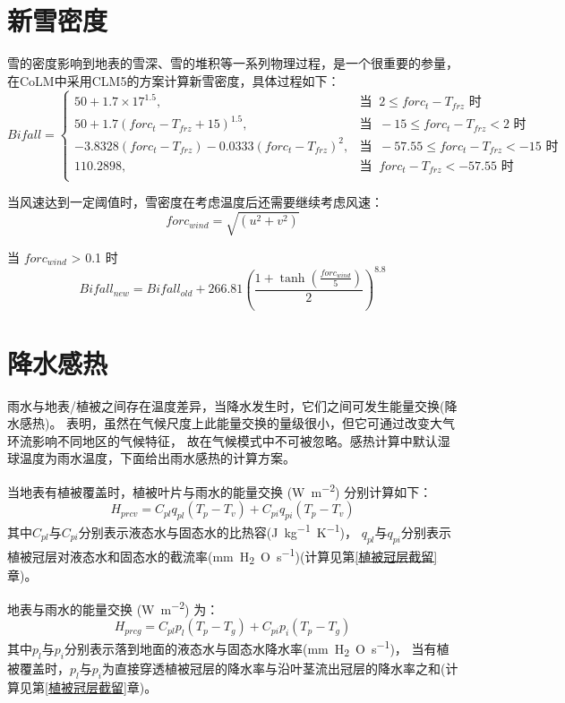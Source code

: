 \section{新雪密度}
雪的密度影响到地表的雪深、雪的堆积等一系列物理过程，是一个很重要的参量，在CoLM中采用CLM5的方案计算新雪密度，具体过程如下：
\begin{equation*}
Bifall= \begin{cases}
50 + 1.7\times 17^{1.5}, & \text{当 }\ 2\le forc_t - T_{frz} \text{ 时}\\
50 + 1.7(forc_t - T_{frz}+15)^{1.5}, & \text{当 }\ -15\le forc_t - T_{frz} < 2 \text{ 时} \\
-3.8328(forc_t - T_{frz}) - 0.0333(forc_t - T_{frz})^2, & \text{当 }\ -57.55\le forc_t - T_{frz} < -15 \text{ 时} \\
110.2898, & \text{当 }\ forc_t - T_{frz} < -57.55 \text{ 时}\\
\end{cases}
\end{equation*}

当风速达到一定阈值时，雪密度在考虑温度后还需要继续考虑风速：
\begin{equation}
forc_{wind} = \sqrt{(u^2 + v^2)}
\end{equation}

当 $forc_{wind}$ > 0.1 时
\begin{equation}
Bifall_{new} = Bifall_{old} + 266.81{\left(\frac{1 + \tanh (\frac{forc_{wind}}{5})}{2}\right)}^{8.8}
\end{equation}


\section{降水感热}\label{植被地表的雨水感热}
雨水与地表/植被之间存在温度差异，当降水发生时，它们之间可发生能量交换(降水感热)。
\citet{wei2014impact} 表明，虽然在气候尺度上此能量交换的量级很小，但它可通过改变大气环流影响不同地区的气候特征，
故在气候模式中不可被忽略。感热计算中默认湿球温度为雨水温度，下面给出雨水感热的计算方案。

当地表有植被覆盖时，植被叶片与雨水的能量交换 (\unit{W.m^{-2}}) 分别计算如下：
\begin{equation}
H_{prcv}=C_{pl} q_{pl}\left(T_{p}-T_{v}\right)+C_{pi} q_{pi}\left(T_{p}-T_{v}\right)
\end{equation}
其中$C_{pl}$与$C_{pi}$分别表示液态水与固态水的比热容(\unit{J.kg^{-1}.K^{-1}})，
$q_{pl}$与$q_{pi}$分别表示植被冠层对液态水和固态水的截流率(\unit{mm.H_2O.s^{-1}})(计算见第\ref{植被冠层截留}章)。


地表与雨水的能量交换 (\unit{W.m^{-2}}) 为：
\begin{equation}
H_{p r c g}=C_{p l} p_{l}\left(T_{p}-T_{g}\right)+C_{p i} p_{i}\left(T_{p}-T_{g}\right)
\end{equation}
其中$p_l$与$p_i$分别表示落到地面的液态水与固态水降水率(\unit{mm.H_2O.s^{-1}})，
当有植被覆盖时，$p_l$与$p_i$为直接穿透植被冠层的降水率与沿叶茎流出冠层的降水率之和(计算见第\ref{植被冠层截留}章)。











